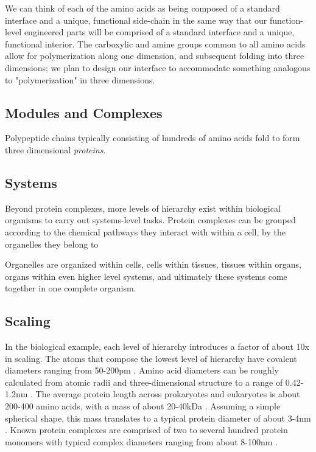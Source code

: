 {We can think of each of the amino acids as being composed of a standard interface and a unique, functional side-chain in the same way that our function-level engineered parts will be comprised of a standard interface and a unique, functional interior.  The carboxylic and amine groups common to all amino acids allow for polymerization along one dimension, and subsequent folding into three dimensions; we plan to design our interface to accommodate something analogous to "polymerization" in three dimensions.\\

 \subsection{Modules and Complexes}

Polypeptide chains typically consisting of hundreds of amino acids fold to form three dimensional \textit{proteins}.  

\subsection{Systems}

Beyond protein complexes, more levels of hierarchy exist within biological organisms to carry out systems-level tasks.  Protein complexes can be grouped according to the chemical pathways they interact with within a cell, by the organelles they belong to                                                                                                                                                                                                 

Organelles are organized within cells, cells within tissues, tissues within organs, organs within even higher level systems, and ultimately these systems come together in one complete organism.

\subsection{Scaling}

In the biological example, each level of hierarchy introduces a factor of about 10x in scaling.  The atoms that compose the lowest level of hierarchy have covalent diameters ranging from 50-200pm \cite{Slater1993}.  Amino acid diameters can be roughly calculated from atomic radii and three-dimensional structure to a range of 0.42-1.2nm \cite{Pool2003}.  The average protein length across prokaryotes and eukaryotes is about 200-400 amino acids, with a mass of about 20-40kDa \cite{Brocchieri2005}.  Assuming a simple spherical shape, this mass translates to a typical protein diameter of about 3-4nm \cite{Erickson2009}.  Known protein complexes are comprised of two to several hundred protein monomers with typical complex diameters ranging from about 8-100nm \cite{Yang2010a}.\\

}

